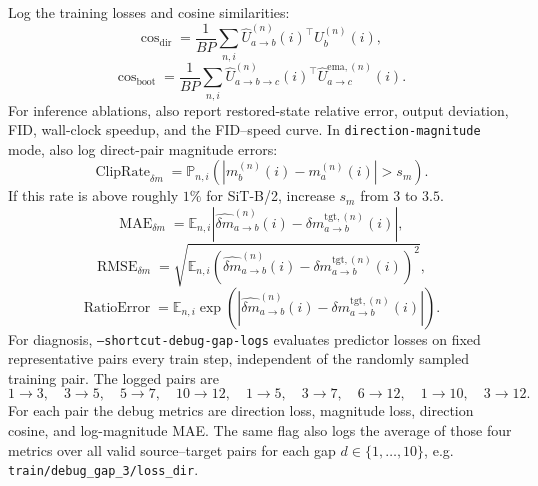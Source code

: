 \documentclass[11pt]{article}
\begin{document}
Log the training losses and cosine similarities:
\[
    \cos_{\mathrm{dir}}=
    \frac{1}{BP}\sum_{n,i}
    \hat U_{a\rightarrow b}^{(n)}(i)^\top U_b^{(n)}(i),
\]
\[
    \cos_{\mathrm{boot}}=
    \frac{1}{BP}\sum_{n,i}
    \hat U_{a\rightarrow b\rightarrow c}^{(n)}(i)^\top
    \hat U_{a\rightarrow c}^{\mathrm{ema},(n)}(i).
\]
For inference ablations, also report restored-state relative error, output
deviation, FID, wall-clock speedup, and the FID--speed curve.
In \texttt{direction-magnitude} mode, also log direct-pair magnitude errors:
\[
    \operatorname{ClipRate}_{\delta m}
    =
    \mathbb{P}_{n,i}\left(|m_b^{(n)}(i)-m_a^{(n)}(i)|>s_m\right).
\]
If this rate is above roughly $1\%$ for SiT-B/2, increase $s_m$ from $3$ to
$3.5$.
\[
    \operatorname{MAE}_{\delta m}=
    \mathbb{E}_{n,i}\left|\hat{\delta m}_{a\rightarrow b}^{(n)}(i)
    -\delta m_{a\rightarrow b}^{\mathrm{tgt},(n)}(i)\right|,
\]
\[
    \operatorname{RMSE}_{\delta m}
    =
    \sqrt{
    \mathbb{E}_{n,i}
    \left(\hat{\delta m}_{a\rightarrow b}^{(n)}(i)
    -\delta m_{a\rightarrow b}^{\mathrm{tgt},(n)}(i)\right)^2
    },
\]
\[
    \operatorname{RatioError}
    =
    \mathbb{E}_{n,i}
    \exp\!\left(
    \left|\hat{\delta m}_{a\rightarrow b}^{(n)}(i)
    -\delta m_{a\rightarrow b}^{\mathrm{tgt},(n)}(i)\right|
    \right).
\]
For diagnosis, \texttt{--shortcut-debug-gap-logs} evaluates predictor losses on
fixed representative pairs every train step, independent of the randomly
sampled training pair. The logged pairs are
\[
    1\!\rightarrow\!3,\quad 3\!\rightarrow\!5,\quad 5\!\rightarrow\!7,\quad
    10\!\rightarrow\!12,\quad 1\!\rightarrow\!5,\quad 3\!\rightarrow\!7,\quad
    6\!\rightarrow\!12,\quad 1\!\rightarrow\!10,\quad 3\!\rightarrow\!12.
\]
For each pair the debug metrics are direction loss, magnitude loss, direction
cosine, and log-magnitude MAE.
The same flag also logs the average of those four metrics over all valid
source--target pairs for each gap $d\in\{1,\ldots,10\}$, e.g.
\texttt{train/debug\_gap\_3/loss\_dir}.
\end{document}
